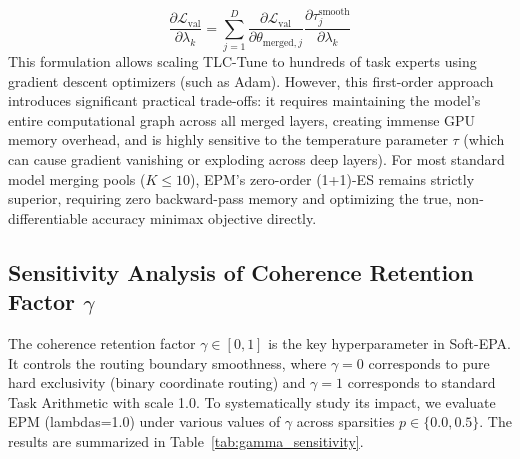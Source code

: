 \begin{equation}
\label{eq:first_order_grad}
\frac{\partial \mathcal{L}_{\text{val}}}{\partial \lambda_k} = \sum_{j=1}^D \frac{\partial \mathcal{L}_{\text{val}}}{\partial \theta_{\text{merged}, j}} \frac{\partial \tau^{\text{smooth}}_j}{\partial \lambda_k}
\end{equation}
This formulation allows scaling TLC-Tune to hundreds of task experts using gradient descent optimizers (such as Adam). However, this first-order approach introduces significant practical trade-offs: it requires maintaining the model's entire computational graph across all merged layers, creating immense GPU memory overhead, and is highly sensitive to the temperature parameter $\tau$ (which can cause gradient vanishing or exploding across deep layers). For most standard model merging pools ($K \le 10$), EPM's zero-order (1+1)-ES remains strictly superior, requiring zero backward-pass memory and optimizing the true, non-differentiable accuracy minimax objective directly.

\subsection{Sensitivity Analysis of Coherence Retention Factor $\gamma$}
The coherence retention factor $\gamma \in [0, 1]$ is the key hyperparameter in Soft-EPA. It controls the routing boundary smoothness, where $\gamma=0$ corresponds to pure hard exclusivity (binary coordinate routing) and $\gamma=1$ corresponds to standard Task Arithmetic with scale 1.0. To systematically study its impact, we evaluate EPM (lambdas=1.0) under various values of $\gamma$ across sparsities $p \in \{0.0, 0.5\}$. The results are summarized in Table~\ref{tab:gamma_sensitivity}.

